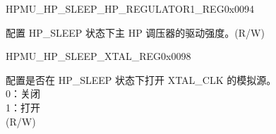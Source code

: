 \begin{register}{H}{PMU\_HP\_SLEEP\_HP\_REGULATOR1\_REG}{0x0094}\label{regdesc:PMUHPSLEEPHPREGULATOR1REG}
%
%
\regnewline%
\begin{regdesc}\begin{reglist}
\label{fielddesc:PMUHPSLEEPHPREGULATORDRVB}\item [PMU\_HP\_SLEEP\_HP\_REGULATOR\_DRV\_B] 配置 HP\_SLEEP 状态下主 HP 调压器的驱动强度。(R/W)
\end{reglist}\end{regdesc}
\end{register}


\begin{register}{H}{PMU\_HP\_SLEEP\_XTAL\_REG}{0x0098}\label{regdesc:PMUHPSLEEPXTALREG}
%
%
\regnewline%
\begin{regdesc}\begin{reglist}
\label{fielddesc:PMUHPSLEEPXPDXTAL}\item [PMU\_HP\_SLEEP\_XPD\_XTAL] 配置是否在 HP\_SLEEP 状态下打开 XTAL\_CLK 的模拟源。\\
0：关闭\\
1：打开\\
(R/W)
\end{reglist}\end{regdesc}
\end{register}


